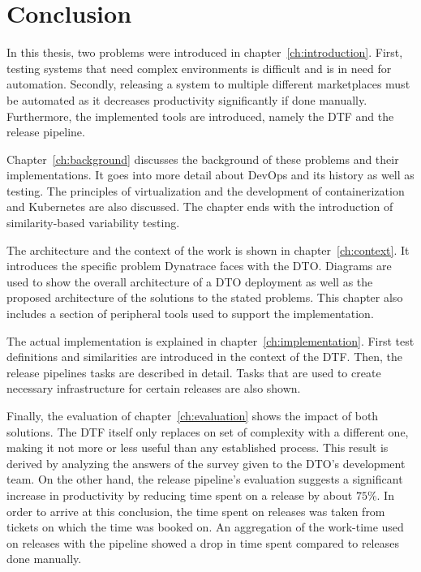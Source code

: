 \chapter{Conclusion}\label{ch:conclusion}

In this thesis, two problems were introduced in chapter~\ref{ch:introduction}.
First, testing systems that need complex environments is difficult and is in need for automation.
Secondly, releasing a system to multiple different marketplaces must be automated as it decreases productivity significantly if done manually.
Furthermore, the implemented tools are introduced, namely the DTF and the release pipeline.

Chapter~\ref{ch:background} discusses the background of these problems and their implementations.
It goes into more detail about DevOps and its history as well as testing.
The principles of virtualization and the development of containerization and Kubernetes are also discussed.
The chapter ends with the introduction of similarity-based variability testing.

The architecture and the context of the work is shown in chapter~\ref{ch:context}.
It introduces the specific problem Dynatrace faces with the DTO.
Diagrams are used to show the overall architecture of a DTO deployment as well as the proposed architecture of the solutions to the stated problems.
This chapter also includes a section of peripheral tools used to support the implementation.

The actual implementation is explained in chapter~\ref{ch:implementation}.
First test definitions and similarities are introduced in the context of the DTF.
Then, the release pipelines tasks are described in detail.
Tasks that are used to create necessary infrastructure for certain releases are also shown.

Finally, the evaluation of chapter~\ref{ch:evaluation} shows the impact of both solutions.
The DTF itself only replaces on set of complexity with a different one, making it not more or less useful than any established process.
This result is derived by analyzing the answers of the survey given to the DTO's development team.
On the other hand, the release pipeline's evaluation suggests a significant increase in productivity by reducing time spent on a release by about $75 \%$.
In order to arrive at this conclusion, the time spent on releases was taken from tickets on which the time was booked on.
An aggregation of the work-time used on releases with the pipeline showed a drop in time spent compared to releases done manually.
